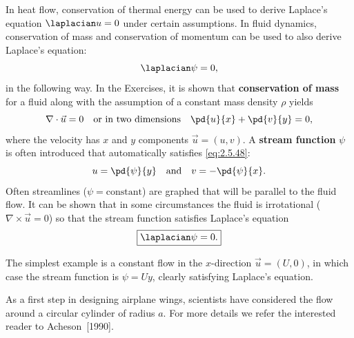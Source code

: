 In heat flow, conservation of thermal energy can be used to derive Laplace's equation $\laplacian u = 0$ under certain assumptions. In fluid dynamics, conservation of mass and conservation of momentum can be used to also derive Laplace's equation:
\[
\laplacian\psi = 0,
\]
in the following way. In the Exercises, it is shown that \textbf{conservation of mass} for a fluid along with the assumption of a constant mass density $\rho$ yields
\begin{equation}
\label{eq:2.5.48}
\nabla\cdot\vec{u} = 0 \quad\text{or in two dimensions}\quad \pd{u}{x} + \pd{v}{y} = 0,
\end{equation}
where the velocity has $x$ and $y$ components $\vec{u} = (u,v)$. A \textbf{stream function} $\psi$ is often introduced that automatically satisfies \eqref{eq:2.5.48}:
\begin{equation}
\label{eq:2.5.49}
u = \pd{\psi}{y} \quad\text{and}\quad v = -\pd{\psi}{x}.
\end{equation}
Often streamlines ($\psi = \text{constant}$) are graphed that will be parallel to the fluid flow. It can be shown that in some circumstances the fluid is irrotational ($\nabla\times\vec{u} = 0$) so that the stream function satisfies Laplace's equation
\begin{equation}
\label{eq:2.5.50}
\boxed{\laplacian\psi = 0.}
\end{equation}

The simplest example is a constant flow in the $x$-direction $\vec{u} = (U,0)$, in which case the stream function is $\psi = Uy$, clearly satisfying Laplace's equation.

As a first step in designing airplane wings, scientists have considered the flow around a circular cylinder of radius $a$. For more details we refer the interested reader to Acheson~[1990].

